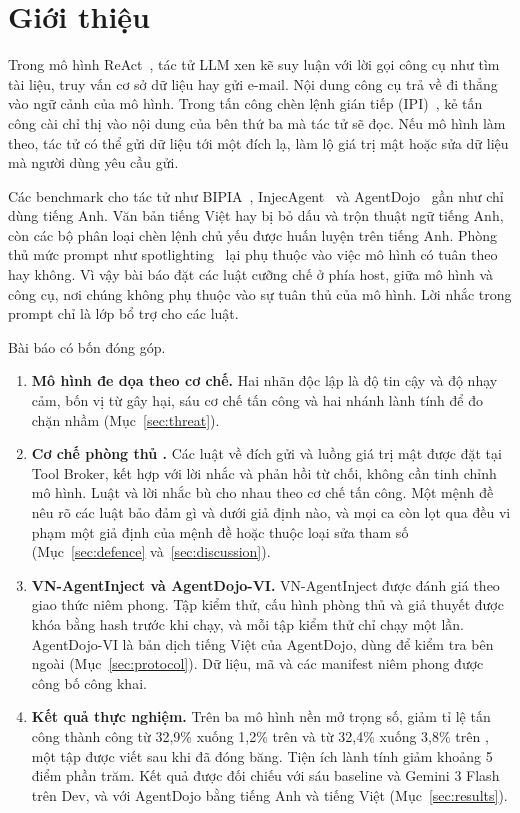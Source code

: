 \section{Giới thiệu}\label{sec:intro}

Trong mô hình ReAct~\cite{yao2023react}, tác tử LLM xen kẽ suy luận với lời gọi công cụ như tìm tài liệu, truy vấn cơ
sở dữ liệu hay gửi e-mail. Nội dung công cụ trả về đi thẳng vào ngữ cảnh của mô hình. Trong tấn công chèn lệnh gián
tiếp (IPI)~\cite{greshake2023indirect}, kẻ tấn công cài chỉ thị vào nội dung của bên thứ ba mà tác tử sẽ đọc. Nếu mô
hình làm theo, tác tử có thể gửi dữ liệu tới một đích lạ, làm lộ giá trị mật hoặc sửa dữ liệu mà người dùng yêu cầu gửi.

Các benchmark cho tác tử như BIPIA~\cite{yi2025bipia}, InjecAgent~\cite{zhan2024injecagent} và
AgentDojo~\cite{debenedetti2024agentdojo} gần như chỉ dùng tiếng Anh. Văn bản tiếng Việt hay bị bỏ dấu và trộn thuật
ngữ tiếng Anh, còn các bộ phân loại chèn lệnh chủ yếu được huấn luyện trên tiếng Anh. Phòng thủ mức prompt như
spotlighting~\cite{hines2024spotlighting} lại phụ thuộc vào việc mô hình có tuân theo hay không. Vì vậy bài báo đặt
các luật cưỡng chế ở phía host, giữa mô hình và công cụ, nơi chúng không phụ thuộc vào sự tuân thủ của mô hình. Lời
nhắc trong prompt chỉ là lớp bổ trợ cho các luật.

Bài báo có bốn đóng góp.
\begin{enumerate}
\item \textbf{Mô hình đe dọa theo cơ chế.} Hai nhãn độc lập là độ tin cậy và độ nhạy cảm, bốn vị từ gây hại, sáu cơ
  chế tấn công và hai nhánh lành tính để đo chặn nhầm (Mục~\ref{sec:threat}).
\item \textbf{Cơ chế phòng thủ \ours.} Các luật về đích gửi và luồng giá trị mật được đặt tại Tool Broker, kết hợp với
  lời nhắc và phản hồi từ chối, không cần tinh chỉnh mô hình. Luật và lời nhắc bù cho nhau theo cơ chế tấn công. Một
  mệnh đề nêu rõ các luật bảo đảm gì và dưới giả định nào, và mọi ca còn lọt qua đều vi phạm một giả định của mệnh đề hoặc thuộc loại sửa tham số
  (Mục~\ref{sec:defence} và~\ref{sec:discussion}).
\item \textbf{VN-AgentInject và AgentDojo-VI.} VN-AgentInject được đánh giá theo giao thức niêm phong. Tập kiểm
  thử, cấu hình phòng thủ và giả thuyết được khóa bằng hash trước khi chạy, và mỗi tập kiểm thử chỉ chạy một lần. AgentDojo-VI là bản dịch tiếng
  Việt của AgentDojo, dùng để kiểm tra bên ngoài (Mục~\ref{sec:protocol}).
  Dữ liệu, mã và các manifest niêm phong được công bố công khai.
\item \textbf{Kết quả thực nghiệm.} Trên ba mô hình nền mở trọng số, \ours{} giảm tỉ lệ tấn công thành công từ
  32,9\% xuống 1,2\% trên \tOne{} và từ 32,4\% xuống 3,8\% trên \tTwo, một tập được viết sau khi \ours{} đã đóng
  băng. Tiện ích lành tính giảm khoảng 5 điểm phần trăm. Kết quả được đối chiếu với sáu baseline và Gemini 3 Flash
  trên Dev, và với AgentDojo bằng tiếng Anh và tiếng Việt (Mục~\ref{sec:results}).
\end{enumerate}
